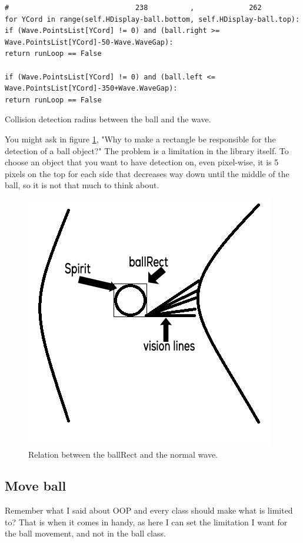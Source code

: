 \begin{listing}[H]
\begin{verbatim}
#                              238          ,             262
for YCord in range(self.HDisplay-ball.bottom, self.HDisplay-ball.top):
if (Wave.PointsList[YCord] != 0) and (ball.right >= Wave.PointsList[YCord]-50-Wave.WaveGap):
return runLoop == False

if (Wave.PointsList[YCord] != 0) and (ball.left <= Wave.PointsList[YCord]-350+Wave.WaveGap):
return runLoop == False
\end{verbatim}
\caption{Collision detection radius between the ball and the wave.}
\label{code:collisionDetection}
\end{listing}

You might ask in figure \ref{fig:colliisonIllustration}, "Why to make a rectangle be responsible for the detection of a ball object?" The problem is a limitation in the library itself. To choose an object that you want to have detection on, even pixel-wise, it is 5 pixels on the top for each side that decreases way down until the middle of the ball, so it is not that much to think about.

\begin{figure}[H]
	\centering
	\includegraphics[width=0.7\linewidth]{usedImages/colliison}
	\caption{Relation between the ballRect and the normal wave.}
	\label{fig:colliisonIllustration}
\end{figure}


\subsection{Move ball}
Remember what I said about OOP and every class should make what is limited to? That is when it comes in handy, as here I can set the limitation I want for the ball movement, and not in the ball class.

